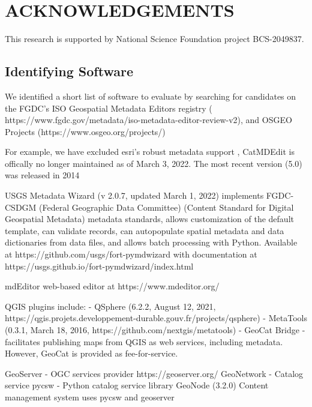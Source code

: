 \documentclass{isprs} %
\begin{document}
\section*{ACKNOWLEDGEMENTS}\label{ACKNOWLEDGEMENTS}
This research is supported by National Science Foundation project BCS-2049837.

{
	\begin{spacing}{1.17}
		\normalsize
	\end{spacing}
}

\subsection{Identifying Software}\label{software}

We identified a short list of software to evaluate by searching for candidates on the FGDC's ISO Geospatial Metadata Editors registry ( https://www.fgdc.gov/metadata/iso-metadata-editor-review-v2), and OSGEO Projects (https://www.osgeo.org/projects/)


For example, we have excluded esri's robust metadata support , CatMDEdit is offically no longer maintained as of March 3, 2022. The most recent version (5.0) was released in 2014



USGS Metadata Wizard (v 2.0.7, updated March 1, 2022) implements FGDC-CSDGM (Federal Geographic Data Committee) (Content Standard for Digital Geospatial Metadata) metadata standards, allows customization of the default template, can validate records, can autopopulate spatial metadata and data dictionaries from data files, and allows batch processing with Python. Available at https://github.com/usgs/fort-pymdwizard with documentation at https://usgs.github.io/fort-pymdwizard/index.html

mdEditor web-based editor at https://www.mdeditor.org/ 

QGIS plugins include:
- QSphere (6.2.2, August 12, 2021, https://qgis.projets.developpement-durable.gouv.fr/projects/qsphere)
- MetaTools (0.3.1, March 18, 2016, https://github.com/nextgis/metatools)
- GeoCat Bridge - facilitates publishing maps from QGIS as web services, including metadata. However, GeoCat is provided as fee-for-service.

GeoServer - OGC services provider https://geoserver.org/ 
GeoNetwork - Catalog service
pycsw - Python catalog service library
GeoNode (3.2.0) Content management system uses pycsw and geoserver
\end{document}
